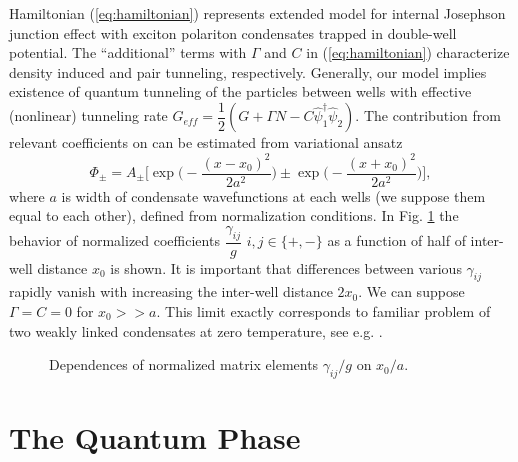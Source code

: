 \documentclass[aps, pre, preprint, groupedaddress, superscriptaddress, showkeys, showpacs] {revtex4-1}
\begin{document}
Hamiltonian (\ref{eq:hamiltonian}) represents extended model for internal Josephson junction effect with exciton polariton condensates trapped in double-well potential.
The ``additional'' terms with $\Gamma$ and $C$ in (\ref{eq:hamiltonian}) characterize density induced and pair tunneling, respectively.
Generally, our model implies existence of quantum tunneling of the particles between wells with effective (nonlinear) tunneling rate $G_{eff} = \dfrac{1}{2}(G+\Gamma N - C\hat{\psi}_1^\dag\hat{\psi}_2)$.
The contribution from relevant coefficients on can be estimated from variational ansatz
%
\begin{equation}
\Phi_{\pm} = A_{\pm} \Big[ \exp \Big( -\dfrac{(x - x_0)^2}{2 a^2} \Big) \pm \exp \Big( -\dfrac{(x + x_0)^2}{2 a^2} \Big) \Big],
\label{eq:two_modes_eq}
\end{equation}
%
where $a$ is width of condensate wavefunctions at each wells (we suppose them equal to each other), defined from normalization conditions.
In Fig. \ref{pic:gamma_pm_vs_g} the behavior of normalized coefficients $\dfrac{\gamma_{ij}}{g}$ $i,j \in \{+,-\}$ as a function of half of inter-well distance $x_0$ is shown.
It is important that differences between various $\gamma_{ij}$ rapidly vanish with increasing the inter-well distance $2x_0$.
We can suppose $\Gamma = C = 0$ for $x_0 >> a$.
This limit exactly corresponds to familiar problem of two weakly linked condensates at zero temperature, see e.g. \cite{Aleiner, Shelykh_2008, Borgh_2010, Raghavan}.
%
\begin{figure}[ht]
\caption{Dependences of normalized matrix elements $\gamma_{ij} / g$ on $x_0 / a$. \label{pic:gamma_pm_vs_g}}
\end{figure}
%

\section{The Quantum Phase \label{sec:quantum_phase}}
\end{document}
